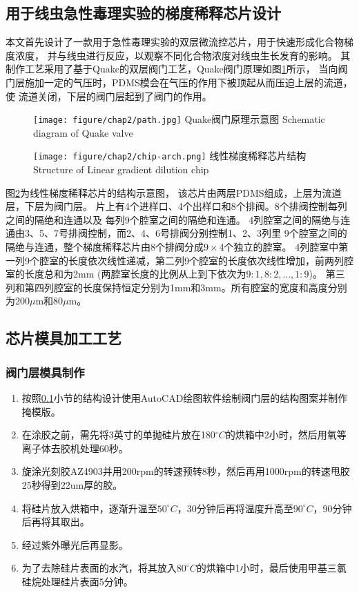 \subsection{用于线虫急性毒理实验的梯度稀释芯片设计}
\label{arch-design}
本文首先设计了一款用于急性毒理实验的双层微流控芯片，用于快速形成化合物梯度浓度，
并与线虫进行反应，以观察不同化合物浓度对线虫生长发育的影响。
其制作工艺采用了基于Quake的双层阀门工艺，Quake阀门原理如图\ref{fig:chap2:path}所示，
当向阀门层施加一定的气压时，PDMS模会在气压的作用下被顶起从而压迫上层的流道，使
流道关闭，下层的阀门层起到了阀门的作用。
	\begin{figure}[htbp]
	  \centering
	  \texttt{[image: figure/chap2/path.jpg]}
	  \bicaption
		{Quake阀门原理示意图}
		{Schematic diagram of Quake valve}
	  \label{fig:chap2:path}
	\end{figure}
\begin{figure}[htbp]
	  \centering
	  \texttt{[image: figure/chap2/chip-arch.png]}
	  \bicaption
		{线性梯度稀释芯片结构}
		{Structure of Linear gradient dilution chip}
	  \label{fig:chap2:chip-arch}
	\end{figure}
	
图\ref{fig:chap2:chip-arch}为线性梯度稀释芯片的结构示意图，
该芯片由两层PDMS组成，上层为流道层，下层为阀门层。
片上有4个进样口、4个出样口和8个排阀。8个排阀控制每列之间的隔绝和连通以及
每列9个腔室之间的隔绝和连通。
4列腔室之间的隔绝与连通由3、5、7号排阀控制，而2、4、6号排阀分别控制1、2、3列里
9个腔室之间的隔绝与连通，整个梯度稀释芯片由8个排阀分成$9\times4$个独立的腔室。
4列腔室中第一列9个腔室的长度依次线性递减，第二列9个腔室的长度依次线性增加，前两列腔室的长度总和为2mm (两腔室长度的比例从上到下依次为$9:1,8:2,\dots,1:9$)。
第三列和第四列腔室的长度保持恒定分别为1mm和3mm。所有腔室的宽度和高度分别为200$\mu$m和80$\mu$m。

\subsection{芯片模具加工工艺}
\subsubsection{阀门层模具制作}
	
	\begin{enumerate}[label={(\arabic*)},font={\color{black!50!black}\bfseries}]
	\item 按照\ref{arch-design}小节的结构设计使用AutoCAD绘图软件绘制阀门层的结构图案并制作掩模版。
	\item 在涂胶之前，需先将3英寸的单抛硅片放在180$^\circ C$的烘箱中2小时，然后用氧等离子体去胶机处理60秒。
	\item 旋涂光刻胶AZ4903并用200rpm的转速预转8秒，然后再用1000rpm的转速甩胶25秒得到22um厚的胶。
	\item 将硅片放入烘箱中，逐渐升温至$50^\circ C$，30分钟后再将温度升高至$90^\circ C$，90分钟后再将其取出。
	\item 经过紫外曝光后再显影。
	\item 为了去除硅片表面的水汽，将其放入$80^\circ C$的烘箱中1小时，最后使用甲基三氯硅烷处理硅片表面5分钟。
	\end{enumerate}
	
